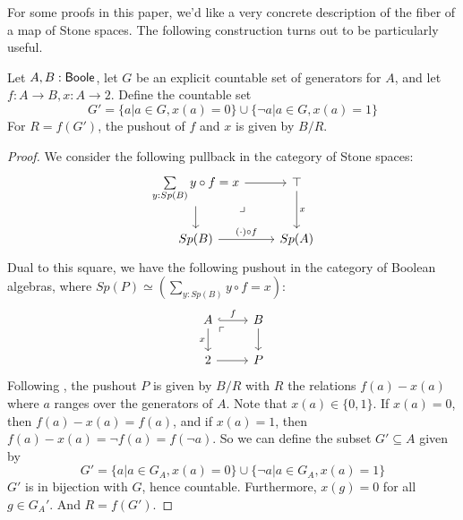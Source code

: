 For some proofs in this paper, 
we'd like a very concrete description of the fiber of a map of Stone spaces. 
The following construction turns out to be particularly useful. 
\begin{lemma}\label{FiberConstruction}
  Let $A,B:\mathsf{Boole}$, let $G$ be an explicit countable set of generators for $A$, and let 
  $f:A \to B, x:A\to 2$. 
  Define the countable set 
  \begin{equation}
    G' = \{a | a\in G, x(a) = 0\} \cup \{\neg a | a \in G, x(a) = 1\}
  \end{equation} 
  For $R = f(G')$,
  the pushout of $f$ and $x$ is given by $B/R$. 
\end{lemma}  
\begin{proof}
We consider the following pullback in the category of Stone spaces:
  \begin{equation}\begin{tikzcd}
    \sum\limits_{y:Sp(B)} y\circ f = x \arrow[d] \arrow[r] \arrow["\lrcorner"{pos=0.125}, phantom, dr] 
    & \top \arrow[d,"x"]\\
    Sp(B) \arrow[r,"(\cdot) \circ f"] & Sp(A)
  \end{tikzcd}  \end{equation}
Dual to this square, we have the following pushout in the category of Boolean algebras,
where $Sp(P) \simeq  (\sum\limits_{y:Sp(B)} y \circ f = x)$:
  \begin{equation}\begin{tikzcd}
    A \arrow[d,"x"'] \arrow[r,hook,"f"] \arrow[rd,phantom,"\ulcorner"{pos=0.125}] & B\arrow[d]\\
    2 \arrow[r] & P
  \end{tikzcd}\end{equation} 
  Following , 
  the pushout $P$ is given by $B/R$ with $R$ the relations $f(a) -x(a)$ 
  where $a$ ranges over the generators of $A$.
  Note that $x(a) \in \{0,1\}$. 
  If $x(a)=0$, then $f(a)-x(a) = f(a)$, 
  and if $x(a) = 1$, then $f(a) -x(a) = \neg f(a) = f(\neg a)$. 
  So we can define the subset $G'\subseteq A$ given by 
  \begin{equation}
    G' = \{a | a\in G_A, x(a) = 0\} \cup \{\neg a | a \in G_A, x(a) = 1\}
  \end{equation} 
  $G'$ is in bijection with $G$, hence countable. 
  Furthermore, $x(g) = 0$ for all $g\in G_A'$. 
  And $R = f(G')$.
\end{proof}





